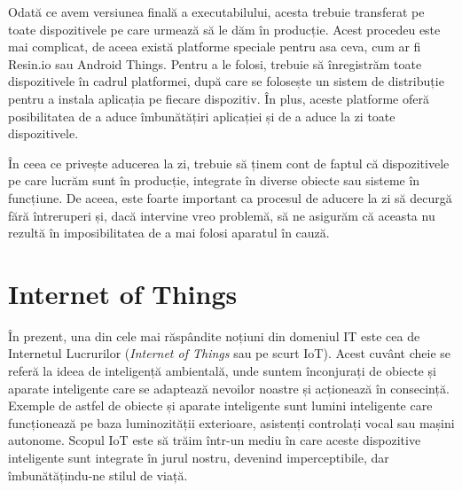 Odată ce avem versiunea finală a executabilului, acesta trebuie transferat pe
toate dispozitivele pe care urmează să le dăm în producție. Acest procedeu este
mai complicat, de aceea există platforme speciale pentru asa ceva, cum ar fi
Resin.io sau Android Things. Pentru a le folosi, trebuie să înregistrăm toate
dispozitivele în cadrul platformei, după care se folosește un sistem de
distribuție pentru a instala aplicația pe fiecare dispozitiv. În plus, aceste
platforme oferă posibilitatea de a aduce îmbunătățiri aplicației și de a aduce
la zi toate dispozitivele.

În ceea ce privește aducerea la zi, trebuie să ținem cont de faptul că
dispozitivele pe care lucrăm sunt în producție, integrate în diverse obiecte sau
sisteme în funcțiune. De aceea, este foarte important ca procesul de aducere la
zi să decurgă fără întreruperi și, dacă intervine vreo problemă, să ne
asigurăm că aceasta nu rezultă în imposibilitatea de a mai folosi aparatul în
cauză.

\section{Internet of Things}
\label{sec:embed:iot}

În prezent, una din cele mai răspândite noțiuni din domeniul IT este cea de
Internetul Lucrurilor (\textit{Internet of Things} sau pe scurt IoT). Acest cuvânt cheie
se referă la ideea de inteligență ambientală, unde suntem înconjurați de obiecte
și aparate inteligente care se adaptează nevoilor noastre și acționează în
consecință. Exemple de astfel de obiecte și aparate inteligente sunt lumini inteligente care funcționează pe baza luminozității
exterioare, asistenți controlați vocal sau mașini autonome. Scopul IoT
este să trăim într-un mediu în care aceste dispozitive inteligente sunt
integrate în jurul nostru, devenind imperceptibile, dar îmbunătățindu-ne stilul
de viață.

